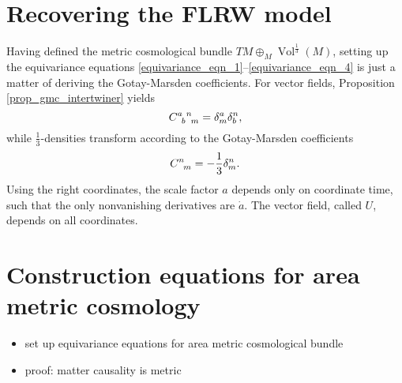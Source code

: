\section{Recovering the FLRW model}
Having defined the metric cosmological bundle $TM \oplus_M \operatorname{Vol}^{\frac{1}{3}}(M)$, setting up the equivariance equations \eqref{equivariance_eqn_1}--\eqref{equivariance_eqn_4} is just a matter of deriving the Gotay-Marsden coefficients. For vector fields, Proposition \ref{prop_gmc_intertwiner} yields
\begin{equation}
  \gmc{a}{b}{n}{m} = \delta^a_m \delta^n_b,
\end{equation}
while $\frac{1}{3}$-densities transform according to the Gotay-Marsden coefficients
\begin{equation}
  \gmc{}{}{n}{m} = -\frac{1}{3} \delta^n_m.
\end{equation}
Using the right coordinates, the scale factor $a$ depends only on coordinate time, such that the only nonvanishing derivatives are $\dot a$. The vector field, called $U$, depends on all coordinates.

\newpage

\section{Construction equations for area metric cosmology}
\begin{itemize}
\item set up equivariance equations for area metric cosmological bundle
\item proof: matter causality is metric
\end{itemize}

